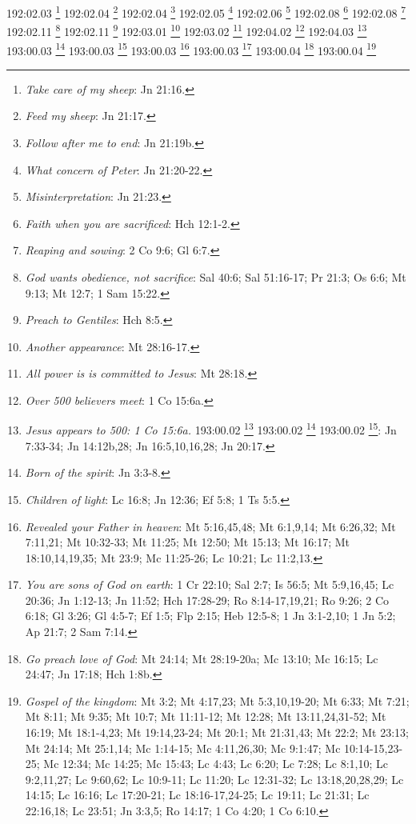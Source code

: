 192:02.03 \footnote{\textit{Take care of my sheep}: Jn 21:16.}
192:02.04 \footnote{\textit{Feed my sheep}: Jn 21:17.}
192:02.04 \footnote{\textit{Follow after me to end}: Jn 21:19b.}
192:02.05 \footnote{\textit{What concern of Peter}: Jn 21:20-22.}
192:02.06 \footnote{\textit{Misinterpretation}: Jn 21:23.}
192:02.08 \footnote{\textit{Faith when you are sacrificed}: Hch 12:1-2.}
192:02.08 \footnote{\textit{Reaping and sowing}: 2 Co 9:6; Gl 6:7.}
192:02.11 \footnote{\textit{God wants obedience, not sacrifice}: Sal 40:6; Sal 51:16-17; Pr 21:3; Os 6:6; Mt 9:13; Mt 12:7; 1 Sam 15:22.}
192:02.11 \footnote{\textit{Preach to Gentiles}: Hch 8:5.}
192:03.01 \footnote{\textit{Another appearance}: Mt 28:16-17.}
192:03.02 \footnote{\textit{All power is is committed to Jesus}: Mt 28:18.}
192:04.02 \footnote{\textit{Over 500 believers meet}: 1 Co 15:6a.}
192:04.03 \footnote{\textit{Jesus appears to 500: 1 Co 15:6a.}
193:00.02 \footnote{\textit{Jesus' discourse to leaders}: Lc 24:44-48.}
193:00.02 \footnote{\textit{Told of death & resurrection}: Mt 16:21; Mt 17:22-23a; Mt 20:17-19; Mt 27:63; Mc 8:31; Mc 9:31; Mc 10:32-34; Lc 9:22,31,43b-44; Lc 18:31-33; Lc 24:7,46; Jn 14:28a; Jn 20:9.}
193:00.02 \footnote{\textit{Told}: Jesus must return to Father}: Jn 7:33-34; Jn 14:12b,28; Jn 16:5,10,16,28; Jn 20:17.}
193:00.03 \footnote{\textit{Born of the spirit}: Jn 3:3-8.}
193:00.03 \footnote{\textit{Children of light}: Lc 16:8; Jn 12:36; Ef 5:8; 1 Ts 5:5.}
193:00.03 \footnote{\textit{Revealed your Father in heaven}: Mt 5:16,45,48; Mt 6:1,9,14; Mt 6:26,32; Mt 7:11,21; Mt 10:32-33; Mt 11:25; Mt 12:50; Mt 15:13; Mt 16:17; Mt 18:10,14,19,35; Mt 23:9; Mc 11:25-26; Lc 10:21; Lc 11:2,13.}
193:00.03 \footnote{\textit{You are sons of God on earth}: 1 Cr 22:10; Sal 2:7; Is 56:5; Mt 5:9,16,45; Lc 20:36; Jn 1:12-13; Jn 11:52; Hch 17:28-29; Ro 8:14-17,19,21; Ro 9:26; 2 Co 6:18; Gl 3:26; Gl 4:5-7; Ef 1:5; Flp 2:15; Heb 12:5-8; 1 Jn 3:1-2,10; 1 Jn 5:2; Ap 21:7; 2 Sam 7:14.}
193:00.04 \footnote{\textit{Go preach love of God}: Mt 24:14; Mt 28:19-20a; Mc 13:10; Mc 16:15; Lc 24:47; Jn 17:18; Hch 1:8b.}
193:00.04 \footnote{\textit{Gospel of the kingdom}: Mt 3:2; Mt 4:17,23; Mt 5:3,10,19-20; Mt 6:33; Mt 7:21; Mt 8:11; Mt 9:35; Mt 10:7; Mt 11:11-12; Mt 12:28; Mt 13:11,24,31-52; Mt 16:19; Mt 18:1-4,23; Mt 19:14,23-24; Mt 20:1; Mt 21:31,43; Mt 22:2; Mt 23:13; Mt 24:14; Mt 25:1,14; Mc 1:14-15; Mc 4:11,26,30; Mc 9:1:47; Mc 10:14-15,23-25; Mc 12:34; Mc 14:25; Mc 15:43; Lc 4:43; Lc 6:20; Lc 7:28; Lc 8:1,10; Lc 9:2,11,27; Lc 9:60,62; Lc 10:9-11; Lc 11:20; Lc 12:31-32; Lc 13:18,20,28,29; Lc 14:15; Lc 16:16; Lc 17:20-21; Lc 18:16-17,24-25; Lc 19:11; Lc 21:31; Lc 22:16,18; Lc 23:51; Jn 3:3,5; Ro 14:17; 1 Co 4:20; 1 Co 6:10.}
